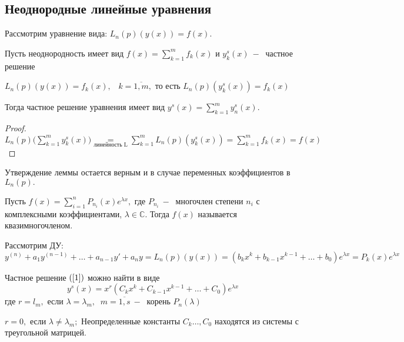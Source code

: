 \subsection{Неоднородные линейные уравнения}
Рассмотрим уравнение вида: $L_n(p)(y(x))=f(x)$.
\begin{lemma}
Пусть неоднородность имеет вид $f(x)=\displaystyle\sum_{k=1}^mf_k(x)$ и $y_k^s(x)~-~$ частное решение\par $L_n(p)(y(x))=f_k(x), \;\;\;k=\overline{1, m},$ то есть $L_n(p)(y^s_k(x))=f_k(x)$\par
Тогда частное решение уравнения имеет вид $y^s(x)=\displaystyle\sum_{k=1}^my_n^s(x).$
\end{lemma}
\begin{proof}
$L_n(p)\Big(\displaystyle\sum_{k=1}^my_k^s(x)\Big)\underset{\text{линейность L}}{=} \displaystyle\sum_{k=1}^mL_n(p)(y^s_k(x))=\displaystyle\sum_{k=1}^mf_k(x)=f(x)$
\end{proof}
\begin{remark}
Утверждение леммы остается верным и в случае переменных коэффициентов в $L_n(p).$
\end{remark}
\begin{definition}
Пусть $f(x)=\displaystyle\sum_{i=1}^nP_{n_i}(x)e^{\lambda x},$ где $P_{n_i}~-~$ многочлен степени $n_i$ с комплексными коэффициентами, $\lambda \in \mathds{C}$. Тогда $f(x)$ называется квазимногочленом.
\end{definition}
Рассмотрим ДУ:
\begin{equation}
    \tag{1}
    \label{1}
    y^{(n)}+a_1y^{(n-1)}+\dots+ a_{n-1} y' + a_ny=L_n(p)(y(x))=(b_kx^k+b_{k-1}x^{k-1}+\dots + b_0)e^{\lambda x}=P_k(x)e^{\lambda x}
\end{equation}
\begin{theorem}
Частное решение $(\ref{1})$ можно найти в виде \begin{equation}
    \tag{2}
    \label{2}
    y^s(x)=x^r(C_kx^k+C_{k-1}x^{k-1}+\dots + C_0)e^{\lambda x}
\end{equation}
где $r=l_m,$ если $\lambda=\lambda_m, \;\;m=\overline{1, s}~-~$ корень $P_n(\lambda)$\par
$r=0,$ если $\lambda\neq \lambda_m;$ Неопределенные константы $C_k\dots, C_0$ находятся из системы с треугольной матрицей.
\end{theorem}
